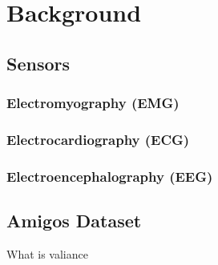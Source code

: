 \section{Background}

\subsection{Sensors}
\subsubsection{Electromyography (EMG)}
\subsubsection{Electrocardiography (ECG)}
\subsubsection{Electroencephalography (EEG)}
\subsection{Amigos Dataset}

What is valiance

